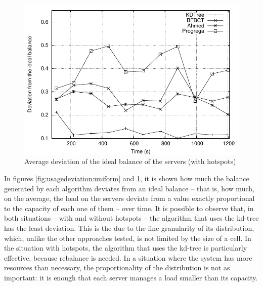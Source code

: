 \documentclass[acmtocl]{acmtrans2m}
\begin{document}
\begin{figure}[!t]
	\centering
	\includegraphics[width=\linewidth]{images/usagedeviation_hotspots}
	\caption{Average deviation of the ideal balance of the servers (with hotspots)}
	\label{fig:usagedeviation:hotspots}
\end{figure}

In figures \ref{fig:usagedeviation:uniform} and \ref{fig:usagedeviation:hotspots}, it is shown how much the balance generated by each algorithm deviates from an ideal balance -- that is, how much, on the average, the load on the servers deviate from a value exactly proportional to the capacity of each one of them -- over time. It is possible to observe that, in both situations -- with and without hotspots -- the algorithm that uses the kd-tree has the least deviation. This is the due to the fine granularity of its distribution, which, unlike the other approaches tested, is not limited by the size of a cell. In the situation with hotspots, the algorithm that uses the kd-tree is particularly effective, because rebalance is needed. In a situation where the system has more resources than necessary, the proportionality of the distribution is not as important: it is enough that each server manages a load smaller than its capacity.
\end{document}
